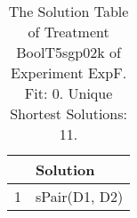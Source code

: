 \begin{table}[ht]
\centering
\begin{tabular}{rp{9cm}}
  \hline
 & Solution \\ 
  \hline
1 & sPair(D1, D2) \\ 
   \hline
\end{tabular}
\caption{The Solution Table of Treatment BoolT5sgp02k of Experiment ExpF. Fit: 0. Unique Shortest Solutions: 11.} 
\end{table}
